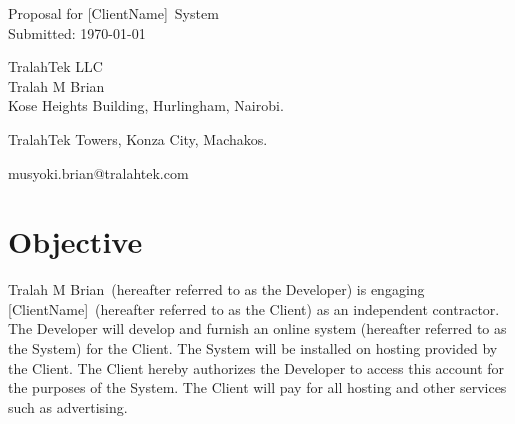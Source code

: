 \documentclass[a4paper,12pt]{article} %
\makeatletter
\newcommand{\YourName}{Tralah M Brian}
\newcommand{\CompanyName}{TralahTek LLC}
\newcommand{\AddressLineOne}{Kose Heights Building, Hurlingham, Nairobi.}
\newcommand{\AddressLineTwo}{TralahTek Towers, Konza City, Machakos.}
\newcommand{\YourEmail}{musyoki.brian@tralahtek.com}
\newcommand{\ClientName}{[ClientName]}
\makeatother
\begin{document}

\begin{titlepage}

\vspace*{\fill} %

\begin{center}

{\LARGE Proposal for \ClientName~System}\\ [1.5cm]

Submitted: \today

\end{center}

\CompanyName\\

\YourName\\

\AddressLineOne

\AddressLineTwo

\YourEmail

\vspace*{\fill} %

\end{titlepage}


\section{Objective}

\YourName~(hereafter referred to as the Developer) is engaging \ClientName~(hereafter referred to as the Client) as an independent contractor. The Developer will develop and furnish an online system (hereafter referred to as the System) for the Client. The System will be installed on hosting provided by the Client. The Client hereby authorizes the Developer to access this account for the purposes of the System. The Client will pay for all hosting and other services such as advertising.

\end{document}
